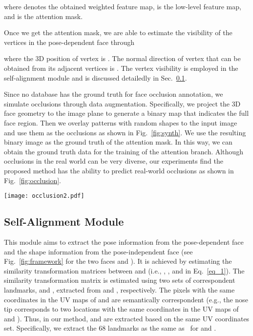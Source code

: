 \documentclass[journal]{IEEEtran}
\begin{document}
	where  denotes the obtained weighted feature map,  is the low-level feature map, and  is the attention mask.
	
	Once we get the attention mask, we are able to estimate the visibility of the vertices in the pose-dependent face through
	
	where the 3D position of vertex  is . The normal direction of vertex  that can be obtained from its adjacent vertices is . The vertex visibility is employed in the self-alignment module and is discussed detailedly in Sec.~\ref{sec:svd}.
	
	Since no database has the ground truth for face occlusion annotation, we simulate occlusions through data augmentation. Specifically, we project the 3D face geometry to the image plane to generate a binary map that indicates the full face region. Then we overlay patterns with random shapes to the input image and use them as the occlusions as shown in Fig.~\ref{fig:synth}. We use the resulting binary image as the ground truth of the attention mask. In this way, we can obtain the ground truth data for the training of the attention branch. Although occlusions in the real world can be very diverse, our experiments find the proposed method has the ability to predict real-world occlusions as shown in Fig.~\ref{fig:occlusion}.
	
	
	\begin{figure*}[tbp]
		\centering
		
		\texttt{[image: occlusion2.pdf]}
		
		\caption{The top row shows the input images and the bottom row shows the attention masks predicted by our attention branch.}
		\label{fig:occlusion}
	\end{figure*}
	
	
	\subsection{Self-Alignment Module}
	\label{sec:svd}
	
	This module aims to extract the pose information from the pose-dependent face  and the shape information from the pose-independent face  (see Fig.~\ref{fig:framework} for the two faces  and ). It is achieved by estimating the similarity transformation matrices between  and  (i.e., , , and  in Eq.~\ref{eq_1}).
	The similarity transformation matrix is estimated using two sets of correspondent landmarks,  and , extracted from  and , respectively.
	The pixels with the same coordinates in the UV maps of  and  are
	semantically correspondent (e.g., the nose tip corresponds to two locations with the same coordinates in the UV maps of  and ). Thus, in our method,  and  are extracted based on the same UV coordinates set. Specifically, we extract the 68 landmarks as the same as~\cite{3DDFA} for  and .
	
\end{document}

